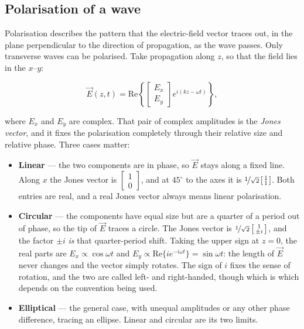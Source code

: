     \subsection{Polarisation of a wave}

        Polarisation describes the pattern that the electric-field vector traces out, in the plane perpendicular to the direction of propagation, as the wave passes. Only transverse waves can be polarised. Take propagation along $z$, so that the field lies in the $x$--$y$:

        \begin{equation*}
            \vec{E}(z,t) = \mathrm{Re}\left\{
            \begin{bmatrix}
                E_{x} \\ E_{y}
            \end{bmatrix}
            e^{i(kz-\omega t)}\right\},
        \end{equation*}

        where $E_{x}$ and $E_{y}$ are complex. That pair of complex amplitudes is the \emph{Jones vector}, and it fixes the polarisation completely through their relative size and relative phase. Three cases matter:

        \begin{itemize}
            \item \textbf{Linear} --- the two components are in phase, so $\vec{E}$ stays along a fixed line. Along $x$ the Jones vector is $\left[\begin{smallmatrix}1\\0\end{smallmatrix}\right]$, and at $45^{\circ}$ to the axes it is $\nicefrac{1}{\sqrt{2}}\left[\begin{smallmatrix}1\\1\end{smallmatrix}\right]$. Both entries are real, and a real Jones vector always means linear polarisation.
            \item \textbf{Circular} --- the components have equal size but are a quarter of a period out of phase, so the tip of $\vec{E}$ traces a circle. The Jones vector is $\nicefrac{1}{\sqrt{2}}\left[\begin{smallmatrix}1\\ \pm i\end{smallmatrix}\right]$, and the factor $\pm i$ \emph{is} that quarter-period shift. Taking the upper sign at $z=0$, the real parts are $E_{x} \propto \cos{\omega t}$ and $E_{y} \propto \mathrm{Re}\{ie^{-i\omega t}\} = \sin{\omega t}$: the length of $\vec{E}$ never changes and the vector simply rotates. The sign of $i$ fixes the sense of rotation, and the two are called left- and right-handed, though which is which depends on the convention being used.
            \item \textbf{Elliptical} --- the general case, with unequal amplitudes or any other phase difference, tracing an ellipse. Linear and circular are its two limits.
        \end{itemize}

